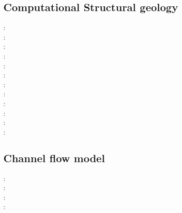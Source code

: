 \subsection{Computational Structural geology}

\begin{scriptsize}
\nineteenseventyone: \cite{stbe71}\\
\nineteenninetyfive: \cite{fige95}\\
\twothousand: \cite{acgf00}\cite{trla00}\\
\twothousandone: \cite{masc01}\\
\twothousandeight: \cite{manc08}\cite{scsf08}\\
\twothousandeleven: \cite{frem11}\\
\twothousandthirteen: \cite{soma13}\cite{lehl13}\\
\twothousandfourteen: \cite{olbm14}\\
\twothousandfifteen: \cite{pevp15}\cite{jalr15}\\
\twothousandseventeen: \cite{naam17}\cite{scdu17}\\
\twothousandeighteen: \cite{naam18}\\
\twothousandnineteen: \cite{llor19}\cite{yada19}\cite{sogh19}
\end{scriptsize}

\subsection{Channel flow model} 

\begin{scriptsize}
\twothousandfour: \cite{jabm04}\\
\twothousandsix: \cite{jabn06}\cite{mebe06}\cite{benj06}\\
\twothousandseven: \cite{jabn07}\\
\twothousandeleven: \cite{jabe11}\\
\end{scriptsize}

